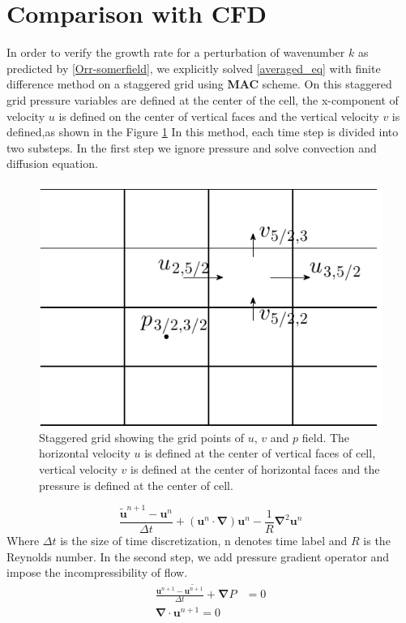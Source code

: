\documentclass[12pt]{report}   %
\newcommand{\bu}{\mathbf{u}}
\newcommand{\grad}{\mathbf{\nabla}}
\begin{document}
\section{Comparison with CFD}
In order to verify the growth rate for a perturbation of wavenumber $k$ as predicted by \eqref{Orr-somerfield}, we explicitly solved  
\eqref{averaged_eq} with finite difference method on a staggered grid using {\bf{MAC}} scheme. On this staggered grid pressure variables are defined at the center of the cell, the x-component of velocity $u$ is defined on the center of vertical faces and the vertical velocity $v$ is defined,as shown in the Figure \ref{staggered}
In this method, each time step is divided into two substeps. In the first step we ignore pressure and solve convection and diffusion equation.
\begin{figure}
\centerline{\includegraphics{StaggardGrid}}
\caption{Staggered grid showing the grid points of $u$, $v$ and $p$ field. The horizontal velocity $u$ is defined at the center of vertical faces of cell, vertical velocity $v$ is defined at the center of horizontal faces and the pressure is defined at the center of cell.   }
\label{staggered}
\end{figure}
\begin{equation}
\frac{\tilde{\bu}^{n+1}-\bu^{n}}{\Delta t}+(\bu^n \cdot \grad )\bu^n - \frac{1}{R} \grad^2 \bu^n
\label{TransportEq}
\end{equation}
Where $\Delta t$ is the size of time discretization, n denotes time label and $R$ is the Reynolds number. In the second step, we add pressure gradient operator and impose the incompressibility of flow.
\begin{equation}
\begin{split}
 \frac{\bu^{n+1}-\tilde{\bu^{n+1}}}{\Delta t} +\grad P &= 0\\
 \grad \cdot \bu^{n+1} = 0
 \label{IncompressibleCondEq}
 \end{split}
\end{equation}
\end{document}
